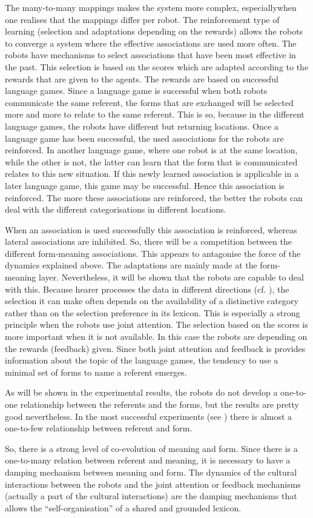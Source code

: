 The many-to-many mappings makes the system more complex, especially\linebreak when one realises that the mappings differ per robot. The reinforcement type of learning (selection and adaptations depending on the rewards) allows the robots to converge a system where the effective associations are used more often. The robots have mechanisms to select associations that have been most effective in the past. This selection is based on the scores which are adapted according to the rewards that are given to the agents. The rewards are based on successful language games. Since a language game is successful when both robots communicate the same referent, the forms that are exchanged will be selected more and more to relate to the same referent. This is so, because in the different language games, the robots have different but returning locations. Once a language game has been successful, the used associations for the robots are reinforced. In another language game, where one robot is at the same location, while the other is not, the latter can learn that the form that is communicated relates to this new situation. If this newly learned association is applicable in a later language game, this game may be successful. Hence this association is reinforced. The more these associations are reinforced, the better the robots can deal with the different categorisations in different locations.

When an association is used successfully this association is reinforced, where\-as lateral associations are inhibited. So, there will be a competition between the different form-meaning associations. This appears to antagonise the force of the dynamics explained above. The adaptations are mainly made at the form-meaning layer. Nevertheless, it will be shown that the robots are capable to deal with this. Because hearer processes the data in different directions (cf. ), the selection it can make often depends on the availability of a distinctive category rather than on the selection preference in its lexicon. This is especially a strong principle when the robots use joint attention. The selection based on the scores is more important when it is not available. In this case the robots are depending on the rewards (feedback) given. Since both joint attention and feedback is provides information about the topic of the language games, the tendency to use a minimal set of forms to name a referent emerges.

As will be shown in the experimental results, the robots do not develop a one-to-one relationship between the referents and the forms, but the results are pretty good nevertheless. In the most successful experiments (see ) there is almost a one-to-few relationship between referent and form. 

So, there is a strong level of co-evolution of meaning and form. Since there is a one-to-many relation between referent and meaning, it is necessary to have a damping mechanism between meaning and form. The dynamics of the cultural interactions between the robots and the joint attention or feedback mechanisms (actually a part of the cultural interactions) are the damping mechanisms that allows the ``self-organisation'' of a shared and grounded lexicon.